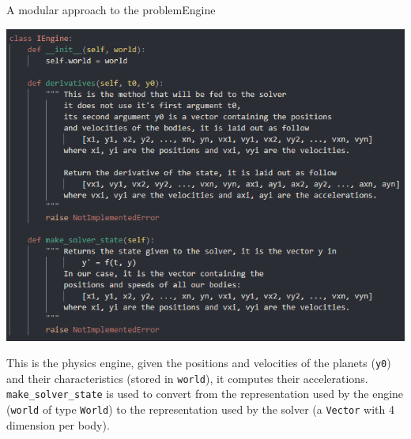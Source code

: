 \documentclass[colorlinks]{beamer}
\begin{document}
\begin{frame}[allowframebreaks]{A modular approach to the problem}{Engine}
    {
        \centering
        \includegraphics[height=.8\textheight]{IEngine.png}
        \par
    }

    \framebreak

    This is the physics engine, given the positions and velocities of the planets (\texttt{y0}) and their characteristics (stored in \texttt{world}), it computes their accelerations.\\

    \texttt{make_solver_state} is used to convert from the representation used by the engine (\texttt{world} of type \texttt{World}) to the representation used by the solver (a \texttt{Vector} with 4 dimension per body).
\end{frame}
\end{document}
